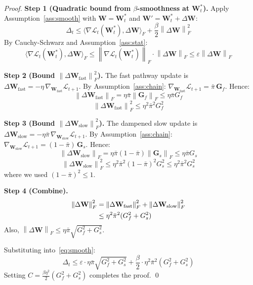 \documentclass[11pt,a4paper]{article}
\theoremstyle{plain}
\theoremstyle{definition}
\theoremstyle{remark}
\newcommand{\norm}[1]{\left\lVert #1 \right\rVert}
\newcommand{\inner}[2]{\langle #1, #2 \rangle}
\newcommand{\pibar}{\bar{\pi}}
\begin{document}
\begin{proof}
\textbf{Step 1 (Quadratic bound from $\beta$-smoothness at $\mathbf{W}_t^*$).}
Apply Assumption~\ref{ass:smooth} with $\mathbf{W} = \mathbf{W}_t^*$ and $\mathbf{W}' = \mathbf{W}_t^* + \Delta\mathbf{W}$:
\begin{equation}
  \Delta_t \leq \inner{\nabla\mathcal{L}_t(\mathbf{W}_t^*)}{\Delta\mathbf{W}}_F + \frac{\beta}{2}\norm{\Delta\mathbf{W}}_F^2
  \label{eq:smooth}
\end{equation}
By Cauchy-Schwarz and Assumption~\ref{ass:stat}:
\[
  \inner{\nabla\mathcal{L}_t(\mathbf{W}_t^*)}{\Delta\mathbf{W}}_F \leq \norm{\nabla\mathcal{L}_t(\mathbf{W}_t^*)}_F \cdot \norm{\Delta\mathbf{W}}_F \leq \varepsilon\norm{\Delta\mathbf{W}}_F
\]

\textbf{Step 2 (Bound $\norm{\Delta\mathbf{W}_\text{fast}}_F^2$).}
The fast pathway update is $\Delta\mathbf{W}_\text{fast} = -\eta\,\nabla_{\mathbf{W}_\text{fast}}\mathcal{L}_{t+1}$.
By Assumption~\ref{ass:chain}: $\nabla_{\mathbf{W}_\text{fast}}\mathcal{L}_{t+1} = \pibar\,\mathbf{G}_f$.
Hence:
\[
  \norm{\Delta\mathbf{W}_\text{fast}}_F = \eta\pibar\norm{\mathbf{G}_f}_F \leq \eta\pibar G_f
\]
\begin{equation}
  \norm{\Delta\mathbf{W}_\text{fast}}_F^2 \leq \eta^2\pibar^2 G_f^2 \label{eq:fast}
\end{equation}

\textbf{Step 3 (Bound $\norm{\Delta\mathbf{W}_\text{slow}}_F^2$).}
The dampened slow update is $\Delta\mathbf{W}_\text{slow} = -\eta\pibar\,\nabla_{\mathbf{W}_\text{slow}}\mathcal{L}_{t+1}$.
By Assumption~\ref{ass:chain}: $\nabla_{\mathbf{W}_\text{slow}}\mathcal{L}_{t+1} = (1-\pibar)\,\mathbf{G}_s$.
Hence:
\[
  \norm{\Delta\mathbf{W}_\text{slow}}_F = \eta\pibar(1-\pibar)\norm{\mathbf{G}_s}_F \leq \eta\pibar G_s
\]
\begin{equation}
  \norm{\Delta\mathbf{W}_\text{slow}}_F^2 \leq \eta^2\pibar^2(1-\pibar)^2 G_s^2 \leq \eta^2\pibar^2 G_s^2 \label{eq:slow}
\end{equation}
where we used $(1-\pibar)^2 \leq 1$.

\textbf{Step 4 (Combine).}
\begin{align}
  \norm{\Delta\mathbf{W}}_F^2 &= \norm{\Delta\mathbf{W}_\text{fast}}_F^2 + \norm{\Delta\mathbf{W}_\text{slow}}_F^2 \notag\\
                              &\leq \eta^2\pibar^2(G_f^2 + G_s^2) \label{eq:total}
\end{align}
Also, $\norm{\Delta\mathbf{W}}_F \leq \eta\pibar\sqrt{G_f^2 + G_s^2}$.

Substituting into~\eqref{eq:smooth}:
\[
  \Delta_t \leq \varepsilon\cdot\eta\pibar\sqrt{G_f^2 + G_s^2} + \frac{\beta}{2}\cdot\eta^2\pibar^2(G_f^2 + G_s^2)
\]
Setting $C = \frac{\beta\eta^2}{2}(G_f^2 + G_s^2)$ completes the proof. \qed
\end{proof}
\end{document}
